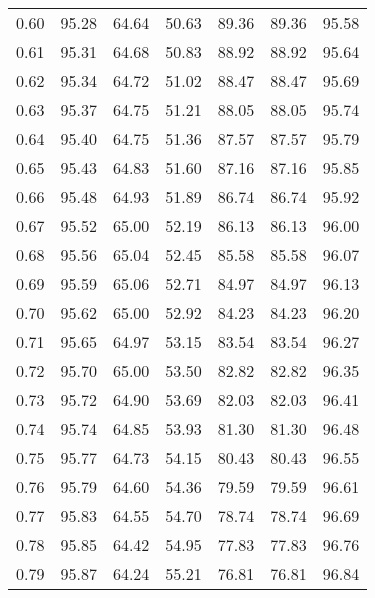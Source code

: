 \begin{tabular}{|c|c|c|c|c|c|c|}
      0.60 &     95.28 &     64.64 &      50.63 &   89.36 &      89.36 &         95.58 \\
      0.61 &     95.31 &     64.68 &      50.83 &   88.92 &      88.92 &         95.64 \\
      0.62 &     95.34 &     64.72 &      51.02 &   88.47 &      88.47 &         95.69 \\
      0.63 &     95.37 &     64.75 &      51.21 &   88.05 &      88.05 &         95.74 \\
      0.64 &     95.40 &     64.75 &      51.36 &   87.57 &      87.57 &         95.79 \\
      0.65 &     95.43 &     64.83 &      51.60 &   87.16 &      87.16 &         95.85 \\
      0.66 &     95.48 &     64.93 &      51.89 &   86.74 &      86.74 &         95.92 \\
      0.67 &     95.52 &     65.00 &      52.19 &   86.13 &      86.13 &         96.00 \\
      0.68 &     95.56 &     65.04 &      52.45 &   85.58 &      85.58 &         96.07 \\
      0.69 &     95.59 &     65.06 &      52.71 &   84.97 &      84.97 &         96.13 \\
      0.70 &     95.62 &     65.00 &      52.92 &   84.23 &      84.23 &         96.20 \\
      0.71 &     95.65 &     64.97 &      53.15 &   83.54 &      83.54 &         96.27 \\
      0.72 &     95.70 &     65.00 &      53.50 &   82.82 &      82.82 &         96.35 \\
      0.73 &     95.72 &     64.90 &      53.69 &   82.03 &      82.03 &         96.41 \\
      0.74 &     95.74 &     64.85 &      53.93 &   81.30 &      81.30 &         96.48 \\
      0.75 &     95.77 &     64.73 &      54.15 &   80.43 &      80.43 &         96.55 \\
      0.76 &     95.79 &     64.60 &      54.36 &   79.59 &      79.59 &         96.61 \\
      0.77 &     95.83 &     64.55 &      54.70 &   78.74 &      78.74 &         96.69 \\
      0.78 &     95.85 &     64.42 &      54.95 &   77.83 &      77.83 &         96.76 \\
      0.79 &     95.87 &     64.24 &      55.21 &   76.81 &      76.81 &         96.84 \\

\end{tabular}
